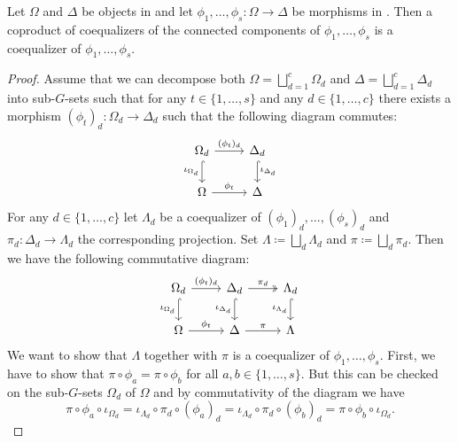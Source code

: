 \begin{lem}
Let $\Omega$ and $\Delta$ be objects in \SkeletalGSets{} and let $\phi_1,\dots,\phi_s\colon \Omega \to \Delta$ be morphisms in \SkeletalGSets{}. Then a coproduct of coequalizers of the connected components of $\phi_1,\dots,\phi_s$ is a coequalizer of $\phi_1,\dots,\phi_s$.
\end{lem}
\begin{proof}
Assume that we can decompose both $\Omega = \bigsqcup_{d=1}^c \Omega_d$ and $\Delta = \bigsqcup_{d=1}^c \Delta_d$ into sub-$G$-sets such that for any $t \in \{1,\dots,s\}$ and any $d \in \{1,\dots,c\}$ there exists a morphism $(\phi_t)_d\colon \Omega_d \to \Delta_d$ such that the following diagram commutes:
\[
\begin{tikzcd}
\Omega_d \arrow[d, "\iota_{\Omega_d}"', hook] \arrow[r, "(\phi_t)_d"] & \Delta_d \arrow[d, "\iota_{\Delta_d}", hook] \\
\Omega \arrow[r, "\phi_t"]                                            & \Delta                                      
\end{tikzcd}
\]
For any $d \in \{1,\dots,c\}$ let $\Lambda_d$ be a coequalizer of $(\phi_1)_d,\dots,(\phi_s)_d$ and $\pi_d \colon \Delta_d \to \Lambda_d$ the corresponding projection. Set $\Lambda \coloneqq \bigsqcup_d \Lambda_d$ and $\pi \coloneqq \bigsqcup_d \pi_d$. Then we have the following commutative diagram:
\[
\begin{tikzcd}
\Omega_d \arrow[d, "\iota_{\Omega_d}"', hook] \arrow[r, "(\phi_t)_d"] & \Delta_d \arrow[d, "\iota_{\Delta_d}"', hook] \arrow[r, "\pi_d", two heads] & \Lambda_d \arrow[d, "\iota_{\Lambda_d}"', hook] \\
\Omega \arrow[r, "\phi_t"]                                            & \Delta \arrow[r, "\pi"]                                                     & \Lambda                                        
\end{tikzcd}
\]
We want to show that $\Lambda$ together with $\pi$ is a coequalizer of $\phi_1,\dots,\phi_s$. First, we have to show that $\pi \circ \phi_a = \pi \circ \phi_b$ for all $a,b \in \{1,\dots,s\}$. But this can be checked on the sub-$G$-sets $\Omega_d$ of $\Omega$ and by commutativity of the diagram we have \[\pi \circ \phi_a \circ \iota_{\Omega_d} = \iota_{\Lambda_d} \circ \pi_d \circ (\phi_a)_d = \iota_{\Lambda_d} \circ \pi_d \circ (\phi_b)_d = \pi \circ \phi_b \circ \iota_{\Omega_d}.\]


\end{proof}
